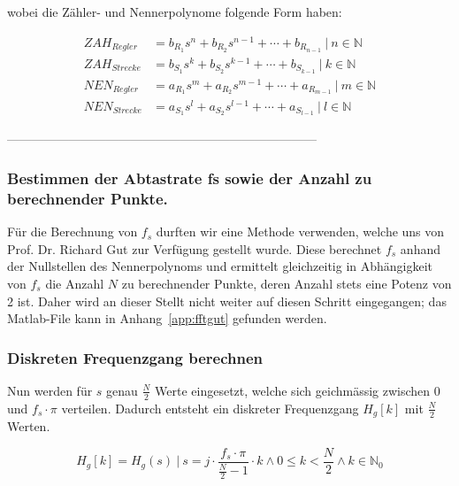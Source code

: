 wobei die Z\"ahler- und Nennerpolynome folgende Form haben:

\begin{align*}
    ZAH_{Regler}  & = b_{R_1} s^n  + b_{R_2} s^{n-1}  + \dotsb  + b_{R_{n-1}}     ~|~ n \in  \mathbb{N} \\
    ZAH_{Strecke} & = b_{S_1} s^k  + b_{S_2} s^{k-1}  + \dotsb  + b_{S_{k-1}}     ~|~ k \in  \mathbb{N}  \\
    NEN_{Regler}  & = a_{R_1} s^m  + a_{R_2} s^{m-1}  + \dotsb  + a_{R_{m-1}}     ~|~ m \in  \mathbb{N}  \\
    NEN_{Strecke} & = a_{S_1} s^l  + a_{S_2} s^{l-1}  + \dotsb  + a_{S_{l-1}}     ~|~ l \in  \mathbb{N}
\end{align*}


 --------------------------------------------------------------------------- %
\subsubsection*{Bestimmen der Abtastrate fs sowie der Anzahl zu berechnender Punkte.}
F\"ur die Berechnung von $f_s$ durften  wir eine Methode verwenden, welche uns
von  Prof. Dr. Richard Gut  zur  Verf\"ugung  gestellt wurde. Diese  berechnet
$f_s$ anhand der Nullstellen des  Nennerpolynoms und ermittelt gleichzeitig in
Abh\"angigkeit von $f_s$  die Anzahl $N$ zu berechnender  Punkte, deren Anzahl
stets eine  Potenz von  2 ist. Daher  wird an dieser  Stellt nicht  weiter auf
diesen Schritt  eingegangen; das  Matlab-File kann  in Anhang~\ref{app:fftgut}
gefunden werden.


\subsubsection*{Diskreten Frequenzgang berechnen}

Nun  werden  f\"ur  $s$  genau $\frac{N}{2}$  Werte  eingesetzt,  welche  sich
geichm\"assig zwischen 0  und $f_s \cdot \pi$  verteilen. Dadurch entsteht ein
diskreter Frequenzgang $H_g[k]$ mit $\frac{N}{2}$ Werten.

\begin{equation*}
    H_g[k] = H_g(s) ~|~ s=j \cdot \frac{f_s \cdot \pi}{\frac{N}{2} - 1} \cdot k \land 0 \leq k < \frac{N}{2} \land k \in \mathbb{N}_0
\end{equation*}


